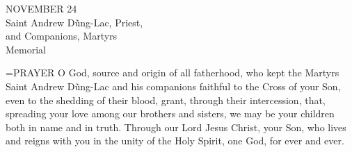 \begin{center}\normalsize NOVEMBER 24\\
\footnotesize Saint Andrew Dũng-Lac, Priest,\\
\footnotesize and Companions, Martyrs\\
\footnotesize Memorial\\
\end{center}

\hangindent=\parindent \small{PRAYER 
O God, source and origin of all fatherhood,
who kept the Martyrs Saint Andrew Dũng-Lac and his companions
faithful to the Cross of your Son,
even to the shedding of their blood,
grant, through their intercession,
that, spreading your love among our brothers and sisters,
we may be your children both in name and in truth.
Through our Lord Jesus Christ, your Son,
who lives and reigns with you in the unity of the Holy Spirit,
one God, for ever and ever.\\}
 

